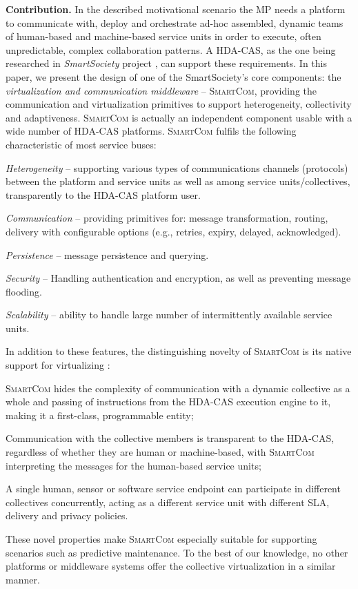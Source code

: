 \documentclass{llncs}
\newcommand{\mdl}{\textsc{SmartCom}}
\begin{document}
  \textbf{Contribution. }
  In the described motivational scenario the MP needs a platform to communicate with, deploy and orchestrate ad-hoc assembled, dynamic teams of human-based and machine-based service units in order to execute, often unpredictable, complex collaboration patterns. A HDA-CAS, as the one being researched in \textit{SmartSociety} project \cite{SmartSocBook}, can support these  requirements. In this paper, we present the design of one of the SmartSociety's core components: the \emph{virtualization and communication middleware} -- \mdl{}, providing the communication and virtualization primitives to support heterogeneity, collectivity and adaptiveness. \mdl{} is actually an independent component usable with a wide number of HDA-CAS platforms.
   \mdl{} fulfils the following characteristic of most service buses:
     \begin{inparaenum}[a) \itshape]
        \item \textit{Heterogeneity} -- supporting various types of communications channels (protocols) between the platform and service units as well as among service units/collectives, transparently to the HDA-CAS platform user.
        \item \textit{Communication} -- providing primitives for: message transformation, routing, delivery with configurable options (e.g., retries, expiry, delayed, acknowledged).
        \item \textit{Persistence} -- message persistence and querying.
        \item \textit{Security} -- Handling authentication and encryption, as well as preventing message flooding.
        \item \textit{Scalability} -- ability to handle large number of intermittently available service units.
      \end{inparaenum}

	In addition to these features, the distinguishing novelty of \mdl{} is its native support for virtualizing : 
	\begin{inparaenum}[i) \itshape]
		\item \mdl{} hides the complexity of communication with a dynamic collective as a whole and passing of instructions from the HDA-CAS execution engine to it, making it a first-class, programmable entity; 
		\item  Communication with the collective members is transparent to the HDA-CAS, regardless of whether they are human or machine-based, with \mdl{} interpreting the messages for the human-based service units; 
		\item  A single human, sensor or software service endpoint can participate in different collectives concurrently, acting as a different service unit with different SLA, delivery and privacy policies. 
	\end{inparaenum}
	These novel properties make \mdl{} especially suitable for supporting scenarios such as predictive maintenance. To the best of our knowledge, no other platforms or middleware systems offer the collective virtualization in a similar manner. 
\end{document}
